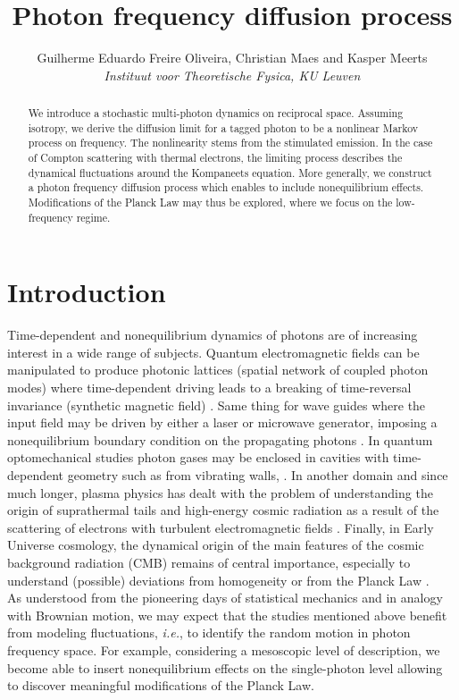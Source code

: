 \documentclass[a4paper,12pt,reqno,superscriptaddress,nofootinbib]{revtex4}
\newcommand{\0}{^{(0)}}
\newcommand{\1}{^{(1)}}
\newcommand{\2}{^{(2)}}
\begin{document}
	\title{Photon frequency diffusion process}	
	\author{Guilherme Eduardo Freire Oliveira, Christian Maes and Kasper Meerts\\ {\it Instituut voor Theoretische Fysica, KU Leuven}}

\begin{abstract}
	We introduce a  stochastic multi-photon dynamics on reciprocal space.  
	Assuming isotropy, we derive the diffusion limit for a tagged photon to be a nonlinear 
	Markov process on frequency.  The nonlinearity stems from the stimulated 
	emission.  In the case of Compton scattering with thermal electrons, the 
	limiting process describes the dynamical fluctuations around the Kompaneets 
	equation.  More generally, we construct a photon frequency diffusion 
	process which enables to include nonequilibrium effects.  Modifications of 
	the Planck Law may thus be explored, where we focus on the low-frequency 
	regime.
\end{abstract}
\maketitle

\section{Introduction}
Time-dependent and nonequilibrium dynamics of photons are of increasing interest in a wide range of subjects. Quantum electromagnetic fields can be manipulated  to produce photonic lattices (spatial network of coupled photon modes) where time-dependent driving leads to a breaking of time-reversal invariance (synthetic magnetic field) \cite{koch,fang,roushan}.  Same thing for wave guides where the input field may be driven by either a laser or microwave generator, imposing a nonequilibrium boundary condition on the propagating photons \cite{pozar,roy}.  In quantum optomechanical studies photon gases may be enclosed in cavities with time-dependent geometry such as from vibrating walls, \cite{metaphotonics}.    In another domain and since much longer, plasma physics has dealt with the problem of understanding the origin of suprathermal tails \cite{supra1,banerjee} and high-energy cosmic radiation as a result of the scattering of electrons with turbulent electromagnetic fields \cite{fermi, sturrock,brin}.  Finally, in Early Universe cosmology, the dynamical origin of the main features of the cosmic background radiation (CMB) remains of central importance, especially to understand (possible) deviations from homogeneity \cite{dark} or from the Planck Law \cite{arcade1,arcade2,edges,arca}.\\
As understood from the pioneering days of statistical mechanics and in analogy with Brownian motion, we may expect that the studies mentioned above benefit from modeling fluctuations, {\it i.e.}, to identify the random motion in photon frequency space. For example, considering a mesoscopic level of description, we become able to insert nonequilibrium effects on the single-photon level allowing to discover meaningful modifications of the Planck Law.\\
\end{document}
